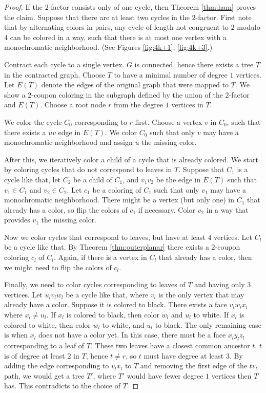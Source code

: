 \begin{proof}
  If the $2$-factor consists only of one cycle, then Theorem \ref{thm:ham} proves the
  claim. Suppose that there are at least two cycles in the $2$-factor. First note that
  by alternating colors in pairs, any cycle of length not congruent to $2$ modulo $4$
  can be colored in a way, such that there is at most one vertex with a monochromatic neighborhood.
  (See Figures \ref{fig:4k+1}, \ref{fig:4k+3}.)

  Contract each cycle to a single vertex. $G$ is connected, hence there exists a tree $T$
  in the contracted graph. Choose $T$ to have a minimal number of degree $1$ vertices.
  Let $E(T)$ denote the edges of the original graph that were mapped
  to $T$. We show a $2$-coupon coloring in the subgraph defined by the union of the $2$-factor
  and $E(T)$. Choose a root node $r$ from the degree $1$ vertices in $T$.

  We color the cycle $C_0$
  corresponding to $r$ first. Choose a vertex $v$ in $C_0$, such that there exists a
  $uv$ edge in $E(T)$. We color $C_0$ such that only $v$ may have a monochromatic
  neighborhood and assign $u$ the missing color.

  After this, we iteratively
  color a child of a cycle that is already colored.
  We start by coloring cycles that do not
  correspond to leaves in $T$. Suppose that $C_1$ is a cycle like that, let $C_2$
  be a child of $C_1$, and $v_1v_2$
  be the edge in $E(T)$ such that $v_1 \in C_1$ and $v_2 \in C_2$. Let $c_1$ be a coloring of
  $C_1$ such that only $v_1$ may have a monochromatic neighborhood. There might be
  a vertex (but only one) in $C_1$ that already has a color, so flip the colors of $c_1$ if
  necessary. Color $v_2$ in a way that provides $v_1$ the missing color.

  Now we
  color cycles that correspond to leaves, but have at least $4$ vertices. Let $C_l$ be a
  cycle like that. By Theorem \ref{thm:outerplanar} there
  exists a $2$-coupon coloring $c_l$ of $C_l$. Again, if there is a vertex in $C_l$ that
  already has a color, then we might need to flip the colors of $c_l$.

  Finally, we need to
  color cycles corresponding to leaves of $T$ and having only $3$ vertices. Let $u_lv_lw_l$ be
  a cycle like that, where $v_l$ is the only vertex that may already have a color. Suppose it
  is colored to black. There exists a face $v_lw_lx_l$ where $x_l \neq u_l$.
  If $x_l$ is colored to black, then color $w_l$ and $u_l$ to white. If $x_l$ is colored
  to white, then color $w_l$ to white, and $u_l$ to black. The only remaining case is
  when $x_l$ does not have a color yet. In this case, there must be a face $x_ly_lz_l$
  corresponding to a leaf of $T$. These two leaves have a closest common ancestor
  $t$. $t$ is of degree at least $2$ in $T$, hence $t \neq r$, so $t$ must have degree
  at least $3$. By adding the edge corresponding to $v_lx_l$ to $T$ and removing
  the first edge of the $tv_l$ path, we would get a tree $T'$, where $T'$ would have
  fewer degree $1$ vertices then $T$ has. This contradicts to the choice of $T$.
\end{proof}

